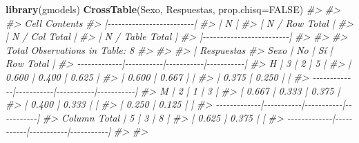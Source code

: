 \documentclass[
]{book}
\newenvironment{Shaded}{\begin{snugshade}}{\end{snugshade}}
\newcommand{\CommentTok}[1]{\textcolor[rgb]{0.56,0.35,0.01}{\textit{#1}}}
\newcommand{\DataTypeTok}[1]{\textcolor[rgb]{0.13,0.29,0.53}{#1}}
\newcommand{\KeywordTok}[1]{\textcolor[rgb]{0.13,0.29,0.53}{\textbf{#1}}}
\newcommand{\NormalTok}[1]{#1}
\newcommand{\OtherTok}[1]{\textcolor[rgb]{0.56,0.35,0.01}{#1}}
\theoremstyle{definition}
\theoremstyle{definition}
\theoremstyle{definition}
\theoremstyle{remark}
\begin{document}
\begin{Shaded}
\begin{Highlighting}[]
\KeywordTok{library}\NormalTok{(gmodels) }
\KeywordTok{CrossTable}\NormalTok{(Sexo, Respuestas, }\DataTypeTok{prop.chisq=}\OtherTok{FALSE}\NormalTok{)}
\CommentTok{\#\textgreater{} }
\CommentTok{\#\textgreater{}  }
\CommentTok{\#\textgreater{}    Cell Contents}
\CommentTok{\#\textgreater{} |{-}{-}{-}{-}{-}{-}{-}{-}{-}{-}{-}{-}{-}{-}{-}{-}{-}{-}{-}{-}{-}{-}{-}{-}{-}|}
\CommentTok{\#\textgreater{} |                       N |}
\CommentTok{\#\textgreater{} |           N / Row Total |}
\CommentTok{\#\textgreater{} |           N / Col Total |}
\CommentTok{\#\textgreater{} |         N / Table Total |}
\CommentTok{\#\textgreater{} |{-}{-}{-}{-}{-}{-}{-}{-}{-}{-}{-}{-}{-}{-}{-}{-}{-}{-}{-}{-}{-}{-}{-}{-}{-}|}
\CommentTok{\#\textgreater{} }
\CommentTok{\#\textgreater{}  }
\CommentTok{\#\textgreater{} Total Observations in Table:  8 }
\CommentTok{\#\textgreater{} }
\CommentTok{\#\textgreater{}  }
\CommentTok{\#\textgreater{}              | Respuestas }
\CommentTok{\#\textgreater{}         Sexo |        No |        Sí | Row Total | }
\CommentTok{\#\textgreater{} {-}{-}{-}{-}{-}{-}{-}{-}{-}{-}{-}{-}{-}|{-}{-}{-}{-}{-}{-}{-}{-}{-}{-}{-}|{-}{-}{-}{-}{-}{-}{-}{-}{-}{-}{-}|{-}{-}{-}{-}{-}{-}{-}{-}{-}{-}{-}|}
\CommentTok{\#\textgreater{}            H |         3 |         2 |         5 | }
\CommentTok{\#\textgreater{}              |     0.600 |     0.400 |     0.625 | }
\CommentTok{\#\textgreater{}              |     0.600 |     0.667 |           | }
\CommentTok{\#\textgreater{}              |     0.375 |     0.250 |           | }
\CommentTok{\#\textgreater{} {-}{-}{-}{-}{-}{-}{-}{-}{-}{-}{-}{-}{-}|{-}{-}{-}{-}{-}{-}{-}{-}{-}{-}{-}|{-}{-}{-}{-}{-}{-}{-}{-}{-}{-}{-}|{-}{-}{-}{-}{-}{-}{-}{-}{-}{-}{-}|}
\CommentTok{\#\textgreater{}            M |         2 |         1 |         3 | }
\CommentTok{\#\textgreater{}              |     0.667 |     0.333 |     0.375 | }
\CommentTok{\#\textgreater{}              |     0.400 |     0.333 |           | }
\CommentTok{\#\textgreater{}              |     0.250 |     0.125 |           | }
\CommentTok{\#\textgreater{} {-}{-}{-}{-}{-}{-}{-}{-}{-}{-}{-}{-}{-}|{-}{-}{-}{-}{-}{-}{-}{-}{-}{-}{-}|{-}{-}{-}{-}{-}{-}{-}{-}{-}{-}{-}|{-}{-}{-}{-}{-}{-}{-}{-}{-}{-}{-}|}
\CommentTok{\#\textgreater{} Column Total |         5 |         3 |         8 | }
\CommentTok{\#\textgreater{}              |     0.625 |     0.375 |           | }
\CommentTok{\#\textgreater{} {-}{-}{-}{-}{-}{-}{-}{-}{-}{-}{-}{-}{-}|{-}{-}{-}{-}{-}{-}{-}{-}{-}{-}{-}|{-}{-}{-}{-}{-}{-}{-}{-}{-}{-}{-}|{-}{-}{-}{-}{-}{-}{-}{-}{-}{-}{-}|}
\CommentTok{\#\textgreater{} }
\CommentTok{\#\textgreater{} }
\end{Highlighting}
\end{Shaded}
\end{document}

